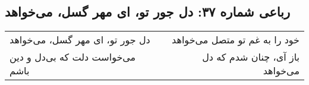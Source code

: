 \begin{center}
\section*{رباعی شماره ۳۷: دل جور تو، ای مهر گسل، می‌خواهد}
\label{sec:037}
\begin{longtable}{l p{0.5cm} r}
دل جور تو، ای مهر گسل، می‌خواهد
&&
خود را به غم تو متصل می‌خواهد
\\
می‌خواست دلت که بی‌دل و دین باشم
&&
باز آی، چنان شدم که دل می‌خواهد
\\
\end{longtable}
\end{center}
